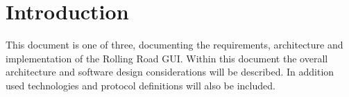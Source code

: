 \chapter{Introduction}

This document is one of three, documenting the requirements, architecture and implementation of the Rolling Road GUI. Within this document the overall architecture and software design considerations will be described. In addition used technologies and protocol definitions will also be included.